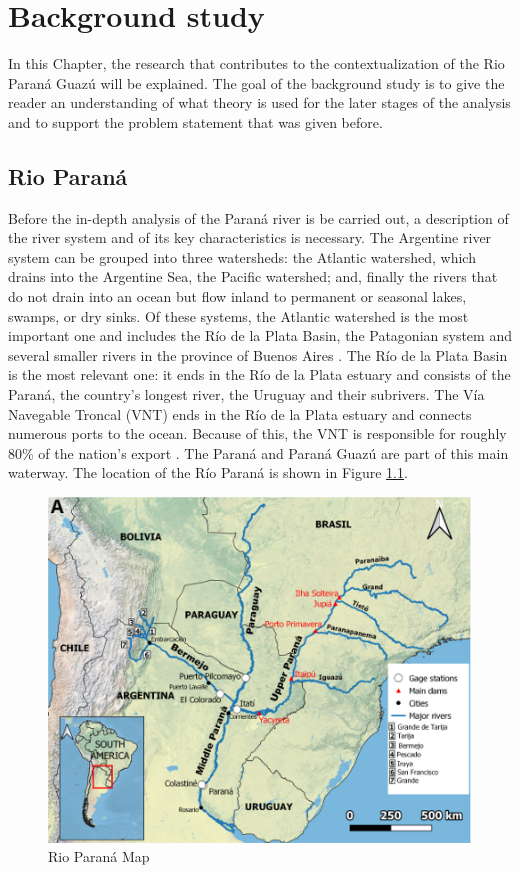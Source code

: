 \chapter{Background study}
\label{chapter:background}
In this Chapter, the research that contributes to the contextualization of the Rio Paraná Guazú will be explained. The goal of the background study is to give the reader an understanding of what theory is used for the later stages of the analysis and to support the problem statement that was given before.

\section{Rio Paraná}
Before the in-depth analysis of the Paraná river is be carried out, a description of the river system and of its key characteristics is necessary. The Argentine river system can be grouped into three watersheds: the Atlantic watershed, which drains into the Argentine Sea, the Pacific watershed; and, finally the rivers that do not drain into an ocean but flow inland to permanent or seasonal lakes, swamps, or dry sinks. Of these systems, the Atlantic watershed is the most important one and includes the Río de la Plata Basin, the Patagonian system and several smaller rivers in the province of Buenos Aires \autocite{farberHydrographyArgentina2024}. The Río de la Plata Basin is the most relevant one: it ends in the Río de la Plata estuary and consists of the Paraná, the country's longest river, the Uruguay and their subrivers. The Vía Navegable Troncal (VNT) ends in the Río de la Plata estuary and connects numerous ports to the ocean. Because of this, the VNT is responsible for roughly 80\% of the nation's export \autocite{agencianacionaldepuertosynavegacionNavegableTroncal2025}. The Paraná and Paraná Guazú are part of this main waterway. The location of the Río Paraná is shown in Figure \ref{fig:rio parana map}.

\begin{figure}[h]
    \centering    \includegraphics[width=0.65\linewidth]{figures/ch2/map rio parana.png}
    \caption{Rio Paraná Map}
    \label{fig:rio parana map}
\end{figure}

